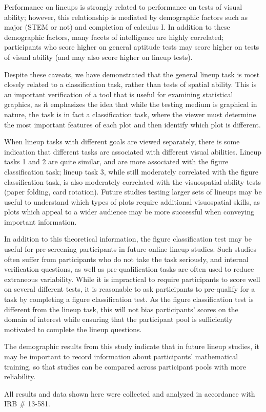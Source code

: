 \documentclass[journal]{vgtc}\usepackage[]{graphicx}\usepackage[]{color}
\begin{document}
Performance on lineups is strongly related to performance on tests of visual ability; however, this relationship is mediated by demographic factors such as major (STEM or not) and completion of calculus I.
In addition to these demographic factors, many facets of intelligence are highly correlated; participants who score higher on general aptitude tests may score higher on tests of visual ability (and may also score higher on lineup tests).

Despite these caveats, we have demonstrated that the general lineup task is most closely related to a classification task, rather than tests of spatial ability.
This is an important verification of a tool that is useful for examining statistical graphics, as it emphasizes the idea that while the testing medium is graphical in nature, the task is in fact a classification task, where the viewer must determine the most important features of each plot and then identify which plot is different.

When lineup tasks with different goals are viewed separately, there is some indication that different tasks are associated with different visual abilities.
Lineup tasks 1 and 2 are quite similar, and are more associated with the figure classification task; lineup task 3, while still moderately correlated with the figure classification task, is also moderately correlated with the visuospatial ability tests (paper folding, card rotation).
Future studies testing larger sets of lineups may be useful to understand which types of plots require additional visuospatial skills, as plots which appeal to a wider audience may be more successful when conveying important information.

In addition to this theoretical information, the figure classification test may be useful for pre-screening participants in future online lineup studies.
Such studies often suffer from participants who do not take the task seriously, and internal verification questions, as well as pre-qualification tasks are often used to reduce extraneous variability.
While it is impractical to require participants to score well on several different tests, it is reasonable to ask participants to pre-qualify for a task by completing a figure classification test.
As the figure classification test is different from the lineup task, this will not bias participants' scores on the domain of interest while ensuring that the participant pool is sufficiently motivated to complete the lineup questions.

The demographic results from this study indicate that in future lineup studies, it may be important to record information about participants' mathematical training, so that studies can be compared across participant pools with more reliability. 




All results and data shown here were collected and analyzed in accordance with IRB \# 13-581.



\end{document}
